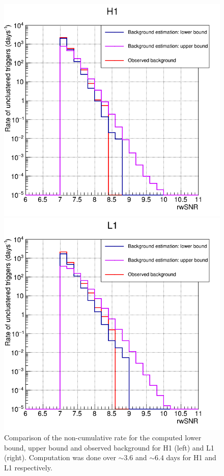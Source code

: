 \begin{figure}
  \centering
  \begin{minipage}{0.45\linewidth}
    \centering
    \includegraphics[width=\linewidth]{sectionFAR/O4/cRateH1.png}
  \end{minipage}
  \hfill
  \begin{minipage}{0.45\linewidth}
    \centering
    \includegraphics[width=\linewidth]{sectionFAR/O4/cRateL1.png}
  \end{minipage}
  \hfill
  \caption{Comparison of the non-cumulative rate for the computed lower bound, upper bound and observed background for H1 (left) and L1 (right). Computation was done over $\sim 3.6$ and $\sim 6.4$ days for H1 and L1 respectively.}
  \label{fig:computed_rate}
\end{figure}


